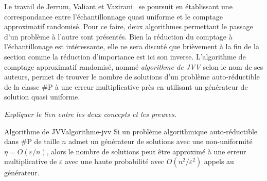 Le travail de Jerrum, Valiant et Vazirani~\cite{jerrumRandomGenerationCombinatorial1986} se poursuit en établissant une correspondance entre l'échantillonnage quasi uniforme et le comptage approximatif randomisé. Pour ce faire, deux algorithmes permettant le passage d'un problème à l'autre sont présentés. Bien la réduction du comptage à l'échantillonage est intéressante, elle ne sera discuté que brièvement à la fin de la section comme la réduction d'importance est ici son inverse. L'algorithme de comptage approximatif randomisé, nommé \textit{algorithme de JVV} selon le nom de ses auteurs, permet de trouver le nombre de solutions d'un problème auto-réductible de la classe \textsf{\#P} à une erreur multiplicative près en utilisant un générateur de solution quasi uniforme. 

\textcolor{mydarkred}{\textit{Expliquer le lien entre les deux concepts et les preuves.}}

\begin{maintheorem}{Algorithme de JVV}{algorithme-jvv}
    Si un problème algorithmique auto-réductible dans \textsf{\#P} de taille $n$ admet un générateur de solutions avec une non-uniformité $\eta = O(\varepsilon / n)$, alors le nombre de solutions peut être approximé à une erreur multiplicative de $\varepsilon$ avec une haute probabilité avec $O(n^{2}/\varepsilon^{2})$ appels au générateur.
\end{maintheorem}

